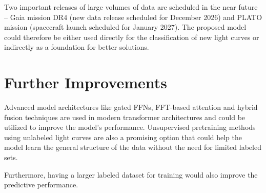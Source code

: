 Two important releases of large volumes of data are scheduled in the near future -- Gaia mission DR4 \parencite{Prusti2016} (new data release scheduled for December 2026) and PLATO mission \parencite{Rauer2025} (spacecraft launch scheduled for January 2027).
The proposed model could therefore be either used directly for the classification of new light curves or indirectly as a foundation for better solutions.

\section{Further Improvements}

Advanced model architectures like gated FFNs, FFT-based attention and hybrid fusion techniques are used in modern transformer architectures and could be utilized to improve the model's performance.
Unsupervised pretraining methods using unlabeled light curves are also a promising option that could help the model learn the general structure of the data without the need for limited labeled sets.

Furthermore, having a larger labeled dataset for training would also improve the predictive performance.
